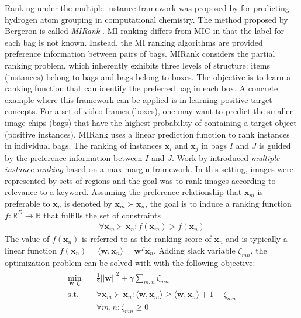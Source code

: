 Ranking under the multiple instance framework was proposed by \cite{Bergeron2008MIRanking} for predicting hydrogen atom grouping in computational chemistry. The method proposed by Bergeron is called \textit{MIRank} \citep{Bergeron2012FastBundleMILRanking}.  MI ranking differs from MIC in that the label for each bag is not known.  Instead, the MI ranking algorithms are provided preference information between pairs of bags. MIRank considers the partial ranking problem, which inherently exhibits three levels of structure: items (instances) belong to bags and bags belong to boxes.  The objective is to learn a ranking function that can identify the preferred bag in each box.  A concrete example where this framework can be applied is in learning positive target concepts.  For a set of video frames (boxes), one may want to predict the smaller image chips (bags) that have the highest probability of containing a target object (positive instances).  MIRank uses a linear prediction function to rank instances in individual bags.  The ranking of instances $\bm{x}_{i}$ and $\bm{x}_{j}$ in bags $I$ and $J$ is guided by the preference information between $I$ and $J$. Work by \cite{Hu2008MIRanking} introduced \textit{multiple-instance ranking} based on a max-margin framework.  In this setting, images were represented by sets of regions and the goal was to rank images according to relevance to a keyword.  Assuming the preference relationship that $\bm{x}_m$ is preferable to $\bm{x}_n$ is denoted by $\bm{x}_m \succ \bm{x}_n$, the goal is to induce a ranking function $f:\mathbb{R}^{D} \to \mathbb{R}$ that fulfills the set of constraints
\begin{align}
	\forall \bm{x}_m \succ \bm{x}_n: f(\bm{x}_{m}) > f(\bm{x}_{n})
\end{align}
\noindent
The value of $f(\bm{x}_n)$ is referred to as the ranking score of $\bm{x}_n$ and is typically a linear function $f(\bm{x}_n) = \langle \bm{w},\bm{x}_{n} \rangle = \bm{w}^{T}\bm{x}_{n}$.  Adding slack variable $\zeta_{mn}$, the optimization problem can be solved with with the following objective:
\begin{align}
	\begin{split}
	\min_{\bm{w},\bm{\zeta}} \quad &\frac{1}{2} ||\bm{w} ||^{2} + \gamma \sum_{m,n} \zeta_{mn} \\
	\text{s.t.} \quad &\forall \bm{x}_m \succ \bm{x}_n: \langle \bm{w},\bm{x}_{m} \rangle \geq \langle\bm{w},\bm{x}_{n} \rangle + 1 -\zeta_{mn}\\
	&\forall m,n: \zeta_{mn} \geq 0\\
	\end{split}
\end{align}
